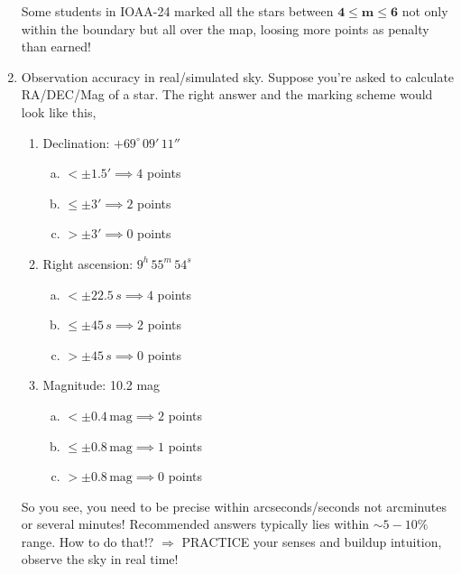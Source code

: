 \documentclass[a4paper,12pt]{extarticle}
\begin{document}
\begin{enumerate}
{\color{red} Some students in IOAA-24 marked all the stars between $\bm{4 \leq m \leq 6}$ not only within the boundary but all over the map, loosing more points as penalty than earned!}	

\item \textsf{Observation accuracy in real/simulated sky.} Suppose you're asked to calculate RA/DEC/Mag of a star. The right answer and the marking scheme would look like this, 

\begin{enumerate}[1.]
	\item Declination: $+69^\circ \, 09' \, 11''$
	\begin{enumerate}[(a)]
		\item $<\pm 1.5' \implies 4$ points
		\item $\leq \pm 3' \implies 2$ points
		\item $>\pm 3' \implies 0$ points
	\end{enumerate}
	\item Right ascension: $9^h \, 55^m\, 54^s$
	\begin{enumerate}[(a)]
		\item $<\pm 22.5\,s \implies 4$ points
		\item $\leq \pm 45\,s \implies 2$ points
		\item $>\pm 45\,s \implies 0$ points
	\end{enumerate}
	\item Magnitude: 10.2 mag
		\begin{enumerate}[(a)]
		\item $<\pm 0.4\, \text{mag} \implies 2$ points
		\item $\leq \pm 0.8\, \text{mag} \implies 1$ points
		\item $>\pm 0.8\, \text{mag} \implies 0$ points
	\end{enumerate}
\end{enumerate}

So you see, you need to be precise within arcseconds/seconds not arcminutes or several minutes! Recommended answers typically lies within $\sim 5-10\%$ range. How to do that!? $\Rightarrow$ PRACTICE your senses and buildup intuition, observe the sky in real time! 
	

\end{enumerate}
\end{document}
